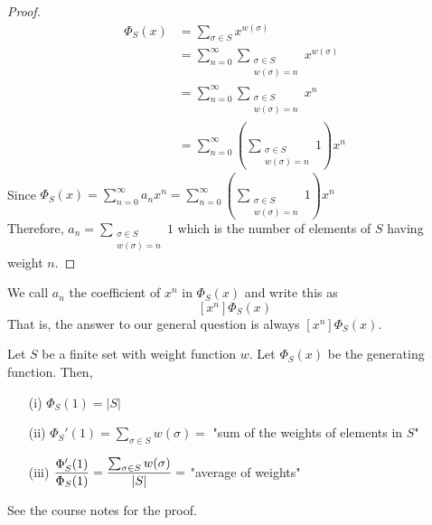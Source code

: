 \documentclass[english, 11pt]{article}
\begin{document}
   \begin{proof}
     \begin{align*}
         \Phi_S(x) & = \sum_{\sigma \in S} x^{w(\sigma)} \\
         & = \sum_{n=0}^{\infty} \sum_{\substack{\sigma \in S \\ w(\sigma)=n}} x^{w(\sigma)} \\
         & = \sum_{n = 0}^{\infty} \sum_{\substack{\sigma \in S \\ w(\sigma)=n}} x^n \\
         & = \sum_{n=0}^{\infty} \left( \sum_{\substack{\sigma \in S \\ w(\sigma)=n}} 1\right) x^n
      \end{align*}
      Since $\Phi_S(x) = \sum_{n=0}^{\infty}a_nx^n = \sum_{n = 0}^{\infty} \left( \sum_{\substack{\sigma \in S \\ w(\sigma)=n}} 1\right) x^n$ \\
      Therefore, $a_n = \sum_{\substack{\sigma \in S \\ w(\sigma)=n}} 1$ which is the number of elements of $S$ having weight $n$.
   \end{proof}

   \begin{notation}
     We call $a_n$ the coefficient of $x^n$ in $\Phi_S(x)$ and write this as
     \[ [x^n]\Phi_S(x) \]
     That is, the answer to our general question is always $[x^n]\Phi_S(x)$.
   \end{notation}

   \begin{thrm}
     Let $S$ be a finite set with weight function $w$. Let $\Phi_S(x)$ be the generating function. Then,
     \begin{itemize}
       \item[(i)] $\displaystyle\Phi_S(1) = |S|$
       \item[(ii)] $\Phi_S'(1) = \displaystyle\sum_{\sigma \in S} w(\sigma) =$ "sum of the weights of elements in $S$"
       \item[(iii)] $\displaystyle\frac{\Phi_S'(1)}{\Phi_S(1)} = \frac{\sum_{\sigma \in S} w(\sigma)}{|S|} =$ "average of weights"
     \end{itemize}
   \end{thrm}

   See the course notes for the proof.
\end{document}
